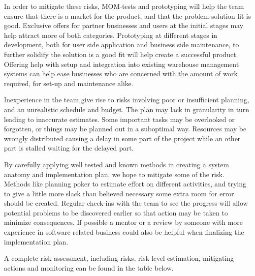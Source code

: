 \documentclass[titlepage]{article}
\begin{document}
In order to mitigate these risks, MOM-tests and prototyping will help the team ensure that there is a market for the product, and that the problem-solution fit is good. Exclusive offers for partner businesses and users at the initial stages may help attract more of both categories. Prototyping at different stages in development, both for user side application and business side maintenance, to further solidify the solution is a good fit will help create a successful product. Offering help with setup and integration into existing warehouse management systems can help ease businesses who are concerned with the amount of work required, for set-up and maintenance alike. 

Inexperience in the team give rise to risks involving poor or insufficient planning, and an unrealistic schedule and budget. The plan may lack in granularity in turn leading to inaccurate estimates. Some important tasks may be overlooked or forgotten, or things may be planned out in a suboptimal way. Resources may be wrongly distributed causing a delay in some part of the project while an other part is stalled waiting for the delayed part.

By carefully applying well tested and known methods in creating a system anatomy and implementation plan, we hope to mitigate some of the risk. Methods like planning poker to estimate effort on different activities, and trying to give a little more slack than believed necessary some extra room for error should be created. Regular check-ins with the team to see the progress will allow potential problems to be discovered earlier so that action may be taken to minimize consequences. If possible a mentor or a review by someone with more experience in software related business could also be helpful when finalizing the implementation plan.

A complete risk assessment, including risks, risk level estimation, mitigating actions and monitoring can be found in the table below.
\end{document}
